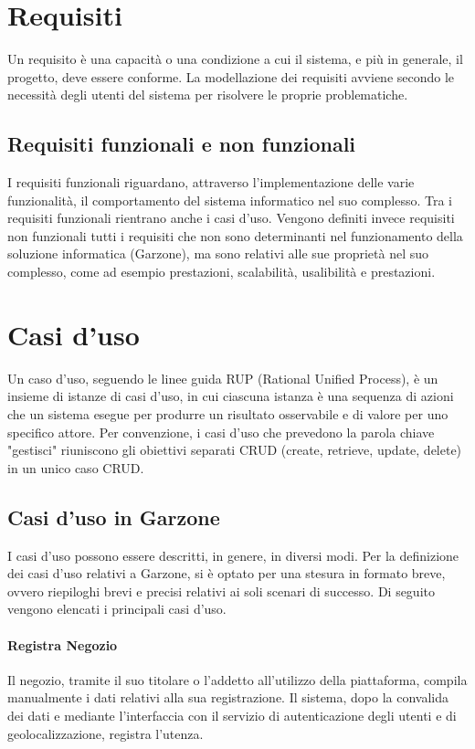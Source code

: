 \section{Requisiti}
Un requisito è una capacità o una condizione a cui il sistema, e più in generale, il progetto, deve essere conforme\cite{JBR99}. La modellazione dei requisiti avviene secondo le necessità degli utenti del sistema per risolvere le proprie problematiche.
\subsection{Requisiti funzionali e non funzionali}
I requisiti funzionali riguardano, attraverso l'implementazione delle varie funzionalità, il comportamento del sistema informatico nel suo complesso. Tra i requisiti funzionali rientrano anche i casi d'uso.
Vengono definiti invece requisiti non funzionali tutti i requisiti che non sono determinanti nel funzionamento della soluzione informatica (Garzone), ma sono relativi alle sue proprietà nel suo complesso, come ad esempio prestazioni, scalabilità, usalibilità e prestazioni.

\section{Casi d'uso}
Un caso d'uso, seguendo le linee guida RUP (Rational Unified Process), è un insieme di istanze di casi d'uso, in cui ciascuna istanza è una sequenza di azioni che un sistema esegue per produrre un risultato osservabile e di valore per uno specifico attore\cite{RUP}. Per convenzione, i casi d'uso che prevedono la parola chiave "gestisci" riuniscono gli obiettivi separati CRUD (create, retrieve, update, delete) in un unico caso CRUD.
\subsection{Casi d'uso in Garzone}
I casi d'uso possono essere descritti, in genere, in diversi modi. Per la definizione dei casi d'uso relativi a Garzone, si è optato per una stesura in formato breve, ovvero riepiloghi brevi e precisi relativi ai soli scenari di successo. Di seguito vengono elencati i principali casi d'uso.
\paragraph{Registra Negozio} Il negozio, tramite il suo titolare o l'addetto all'utilizzo della piattaforma, compila manualmente i dati relativi alla sua registrazione. Il sistema, dopo la convalida dei dati e mediante l'interfaccia con il servizio di autenticazione degli utenti e di geolocalizzazione, registra l'utenza.

